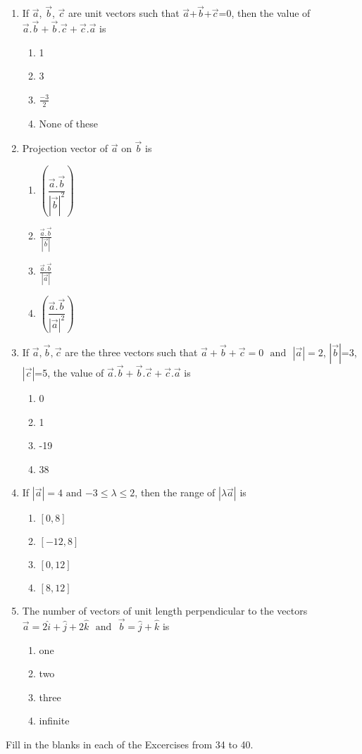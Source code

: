 \documentclass{article}
\providecommand{\abs}[1]{\left\vert#1\right\vert}
\begin{document}
\begin{enumerate}[resume]
\item If $\vec{a}$, $\vec{b}$, $\vec{c}$ are unit vectors such that $\vec{a}$+$\vec{b}$+$\vec{c}$=0, then the value of $\vec{a}.\vec{b}+\vec{b}.\vec{c}+\vec{c}.\vec{a}$ is
	\begin{enumerate}
\item 1
\item 3
\item $\frac{-3}{2}$
\item None of these
\end{enumerate}



\item Projection vector of $\vec{a}$ on $\vec{b}$ is
	\begin{enumerate}
\item $\left(\dfrac{\vec{a}.\vec{b}}{\abs{\vec{b}}^2}\right)$
\item $\frac{\vec{a}.\vec{b}}{\abs{\vec{b}}}$
\item $\frac{\vec{a}.\vec{b}}{\abs{\vec{a}}}$
\item $\left(\dfrac{\vec{a}.\vec{b}}{\abs{\vec{a}}^2}\right)$
\end{enumerate}



\item If $\vec{a},\vec{b},\vec{c}$ are the three vectors such that $\vec{a}+\vec{b}+\vec{c}=0$ $\text{ and }$ $|\vec{a}|=2$, $|\vec{b}|$=3, $|\vec{c}|$=5, the value of $\vec{a}.\vec{b}+\vec{b}.\vec{c}+\vec{c}.\vec{a}$ is
	\begin{enumerate}
\item 0
\item 1	
\item -19
\item 38
\end{enumerate}



\item If $|\vec{a}|=4$ $\text{and}$  $-3\leq\lambda\leq2$, then the range of $|\lambda\vec{a}|$ is
	\begin{enumerate}
\item $\left[0,8\right]$
\item $\left[-12,8\right]$
\item $\left[0,12\right]$	
\item $\left[8,12\right]$
\end{enumerate}

\item The number of vectors of unit length perpendicular to the vectors $\vec{a}=2\hat{i}+\hat{j}+2\hat{k}$ $\text{ and }$ $\vec{b}=\hat{j}+\hat{k}$ is
	\begin{enumerate}
\item one
\item  two
\item three
\item infinite
\end{enumerate}
\end{enumerate}
Fill in the blanks in each of the Excercises from 34 to 40.
\end{document}
